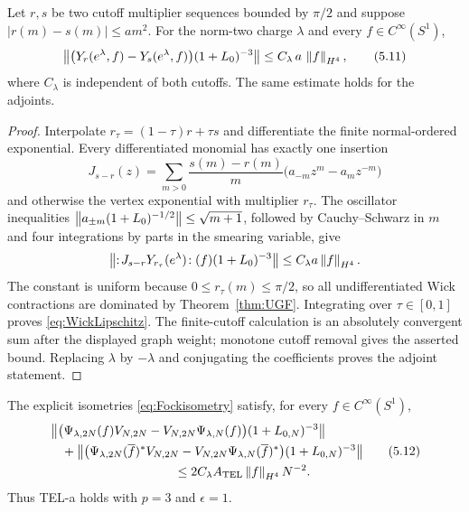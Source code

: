 \begin{lemma}\label{lem:WickLipschitz}
Let $r,s$ be two cutoff multiplier sequences bounded by $\pi/2$ and
suppose $|r(m)-s(m)|\le a m^2$.  For the norm-two charge
$\lambda$ and every $f\in C^\infty(S^1)$,
\[
 \left\lVert\bigl(Y_r(e^\lambda,f)-Y_s(e^\lambda,f)\bigr)
        (1+L_0)^{-3}\right\rVert
 \le C_\lambda\,a\,\left\lVert f\right\rVert_{H^4},
\tag{5.11}\label{eq:WickLipschitz}
\]
where $C_\lambda$ is independent of both cutoffs.  The same estimate
holds for the adjoints.
\end{lemma}

\begin{proof}
Interpolate $r_\tau=(1-\tau)r+\tau s$ and differentiate the finite
normal-ordered exponential.  Every differentiated monomial has exactly
one insertion
\[
 J_{s-r}(z)
 =\sum_{m>0}\frac{s(m)-r(m)}m
   \bigl(a_{-m}z^m-a_mz^{-m}\bigr)
\]
and otherwise the vertex exponential with multiplier $r_\tau$.
The oscillator inequalities
$\left\lVert a_{\pm m}(1+L_0)^{-1/2}\right\rVert\le\sqrt{m+1}$, followed by
Cauchy--Schwarz in $m$ and four integrations by parts in the smearing
variable, give
\[
 \left\lVert:\!J_{s-r}Y_{r_\tau}(e^\lambda)\!:(f)
       (1+L_0)^{-3}\right\rVert
 \le C_\lambda a\left\lVert f\right\rVert_{H^4}.
\]
The constant is uniform because $0\le r_\tau(m)\le\pi/2$, so all
undifferentiated Wick contractions are dominated by
Theorem~\ref{thm:UGF}.  Integrating over $\tau\in[0,1]$ proves
\eqref{eq:WickLipschitz}.  The finite-cutoff calculation is an
absolutely convergent sum after the displayed graph weight; monotone
cutoff removal gives the asserted bound.  Replacing $\lambda$ by
$-\lambda$ and conjugating the coefficients proves the adjoint
statement.
\end{proof}

\begin{theorem}
\label{thm:TELa}
The explicit isometries \eqref{eq:Fockisometry} satisfy, for every
$f\in C^\infty(S^1)$,
\[
\begin{aligned}
 &\norm{\bigl(\Psi_{\lambda,2N}(f)V_{N,2N}
       -V_{N,2N}\Psi_{\lambda,N}(f)\bigr)(1+L_{0,N})^{-3}}\\
 &\quad+
 \norm{\bigl(\Psi_{\lambda,2N}(\overline f)^*V_{N,2N}
       -V_{N,2N}\Psi_{\lambda,N}(\overline f)^*\bigr)
       (1+L_{0,N})^{-3}}\\
 &\hspace{35mm}\le
 2C_\lambda A_{\rm TEL}\norm{f}_{H^4}N^{-2}.
\end{aligned}
\tag{5.12}\label{eq:TELa}
\]
Thus TEL-a holds with $p=3$ and $\epsilon=1$.
\end{theorem}

